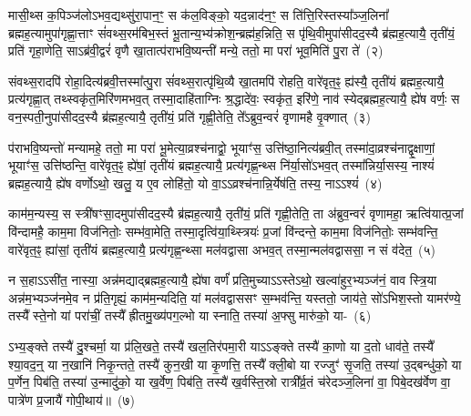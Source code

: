 मासी॒थ्स क॒पिञ्ज॑लो\-ऽभव॒द्यथ्सु॑रा॒पान॒ꣳ॒ स क॑ल॒विङ्को॒ यद॒न्नाद॑न॒ꣳ॒ स ति॑त्ति॒रिस्तस्या᳚\-ञ्ज॒लिना᳚ ब्रह्म\-ह॒त्यामुपा॑गृह्णा॒त्ताꣳ सं॑वथ्स॒रम॑बिभ॒स्तं भू॒तान्य॒भ्य॑क्रोश॒न्ब्रह्म॑ह॒न्निति॒ स पृ॑थि॒वीमुपा॑सीद\-द॒स्यै ब्र॑ह्मह॒त्यायै॒ तृती॑यं॒ प्रति॑ गृहा॒णेति॒ सा\-ऽब्र॑वी॒द्वरं॑ वृणै खा॒तात्प॑रा\-भवि॒ष्यन्ती॑ मन्ये॒ ततो॒ मा परा॑ भूव॒मिति॑ पु॒रा ते॑~(२)\ip

संवथ्स॒रादपि॑ रोहा॒दित्य॑ब्रवी॒त्तस्मा᳚त्पु॒रा सं॑वथ्स॒रात्पृ॑थि॒व्यै खा॒तमपि॑ रोहति॒ वारे॑वृत॒ꣴ॒ ह्य॑स्यै॒ तृती॑यं ब्रह्मह॒त्यायै॒ प्रत्य॑\-गृह्णा॒त् तथ्स्वकृ॑त॒मिरि॑णमभव॒त् तस्मा॒दाहि॑ताग्निः श्र॒द्धादे॑वः॒ स्वकृ॑त॒ इरि॑णे॒ नाव॑ स्येद्ब्रह्मह॒त्यायै॒ ह्ये॑ष वर्णः॒ स वन॒स्पती॒नुपा॑सीदद॒स्यै ब्र॑ह्मह॒त्यायै॒ तृती॑यं॒ प्रति॑ गृह्णी॒तेति॒ ते᳚\-ऽब्रुव॒न्वरं॑ वृणामहै वृ॒क्णात्~(३)\ip

प॑राभवि॒ष्यन्तो॑ मन्यामहे॒ ततो॒ मा परा॑ भू॒मेत्या॒व्रश्च॑नाद्वो॒ भूयाꣳ॑स॒ उत्ति॑ष्ठा॒नित्य॑ब्रवी॒त् तस्मा॑दा॒व्रश्च॑नाद्वृ॒क्षाणां॒ भूयाꣳ॑स॒ उत्ति॑ष्ठन्ति॒ वारे॑वृत॒ꣴ॒ ह्ये॑षां॒ तृती॑यं ब्रह्मह॒त्यायै॒ प्रत्य॑\-गृह्ण॒न्थ्स नि॑र्या॒सो॑\-ऽभव॒त् तस्मा᳚न्निर्या॒सस्य॒ नाश्यं॑ ब्रह्मह॒त्यायै॒ ह्ये॑ष वर्णो\-ऽथो॒ खलु॒ य ए॒व लोहि॑तो॒ यो वा॒\-ऽऽ\-व्रश्च॑नान्नि॒र्येष॑ति॒ तस्य॒ ना\-ऽऽ\-श्यं॑~(४)\ip

काम॑म॒न्यस्य॒ स स्त्री॑षꣳसा॒दमुपा॑सीदद॒स्यै ब्र॑ह्मह॒त्यायै॒ तृती॑यं॒ प्रति॑ गृह्णी॒तेति॒ ता अ॑ब्रुव॒न्वरं॑ वृणामहा॒ ऋत्वि॑यात्प्र॒जां वि॑न्दामहै॒ काम॒मा विज॑नितोः॒ सम्भ॑वा॒मेति॒ तस्मा॒दृत्वि॑या॒थ्स्त्रियः॑ प्र॒जां वि॑न्दन्ते॒ काम॒मा विज॑नितोः॒ सम्भ॑वन्ति॒ वारे॑वृत॒ꣴ॒ ह्या॑सां॒ तृती॑यं ब्रह्मह॒त्यायै॒ प्रत्य॑\-गृह्ण॒न्थ्सा मल॑वद्वासा अभव॒त् तस्मा॒न्मल॑वद्वाससा॒ न सं व॑देत॒~(५)\ip

न स॒हा\-ऽऽ\-सी॑त॒ नास्या॒ अन्न॑मद्याद्ब्रह्मह॒त्यायै॒ ह्ये॑षा वर्णं॑ प्रति॒मुच्या\-ऽऽ\-स्ते\-ऽथो॒ खल्वा॑हुर॒भ्यञ्ज॑नं॒ वाव स्त्रि॒या अन्न॑म॒भ्यञ्ज॑नमे॒व न प्र॑ति॒गृह्यं॒ काम॑म॒न्यदिति॒ यां मल॑वद्वाससꣳ स॒म्भव॑न्ति॒ यस्ततो॒ जाय॑ते॒ सो॑\-ऽभिश॒स्तो यामर॑ण्ये॒ तस्यै᳚ स्ते॒नो यां परा॑चीं॒ तस्यै᳚ ह्रीतमु॒ख्य॑पग॒ल्भो या स्नाति॒ तस्या॑ अ॒फ्सु मारु॑को॒ या-~(६)\ip

ऽभ्य॒ङ्क्ते तस्यै॑ दु॒श्चर्मा॒ या प्र॑लि॒खते॒ तस्यै॑ खल॒तिर॑पमा॒री या\-ऽऽ\-ङ्क्ते तस्यै॑ का॒णो या द॒तो धाव॑ते॒ तस्यै᳚ श्या॒वद॒न्॒ या न॒खानि॑ निकृ॒न्तते॒ तस्यै॑ कुन॒खी या कृ॒णत्ति॒ तस्यै᳚ क्ली॒बो या रज्जुꣳ॑ सृ॒जति॒ तस्या॑ उ॒द्बन्धु॑को॒ या प॒र्णेन॒ पिब॑ति॒ तस्या॑ उ॒न्मादु॑को॒ या ख॒र्वेण॒ पिब॑ति॒ तस्यै॑ ख॒र्वस्ति॒स्रो रात्री᳚र्व्र॒तं च॑रेदञ्ज॒लिना॑ वा॒ पिबे॒दख॑र्वेण वा॒ पात्रे॑ण प्र॒जायै॑ गोपी॒थाय॑॥~(७)\ip

{\anuvakamend[{यथ्सो॑म॒पान॑न्ते वृ॒क्णात् तस्य॒ नाश्यं॑ वदेत॒ मारु॑को॒ या\-ऽख॑र्वेण वा॒ त्रीणि॑ च}]}

